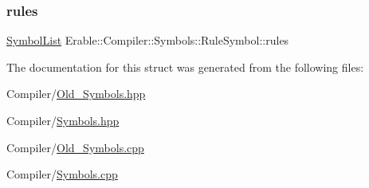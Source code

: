 \mbox{\label{class_erable_1_1_compiler_1_1_symbols_1_1_rule_symbol_ad6a20c302b8e59137d66859a96476545}} 
\subsubsection{\texorpdfstring{rules}{rules}}
{\footnotesize\ttfamily \mbox{\hyperlink{namespace_erable_1_1_compiler_1_1_symbols_a63e8157d2f729d4689d27bacad42f8ed}{Symbol\+List}} Erable\+::\+Compiler\+::\+Symbols\+::\+Rule\+Symbol\+::rules}



The documentation for this struct was generated from the following files\+:\begin{DoxyCompactItemize}
\item 
Compiler/\mbox{\hyperlink{_old___symbols_8hpp}{Old\+\_\+\+Symbols.\+hpp}}\item 
Compiler/\mbox{\hyperlink{_symbols_8hpp}{Symbols.\+hpp}}\item 
Compiler/\mbox{\hyperlink{_old___symbols_8cpp}{Old\+\_\+\+Symbols.\+cpp}}\item 
Compiler/\mbox{\hyperlink{_symbols_8cpp}{Symbols.\+cpp}}\end{DoxyCompactItemize}
